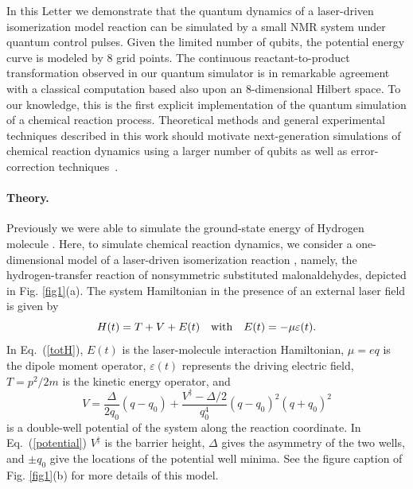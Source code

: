 \documentclass[prl,twocolumn,showpacs]{revtex4}
\newcommand{\be}{\begin{equation}}
\newcommand{\ee}{\end{equation}}
\begin{document}
In this Letter we demonstrate that the quantum dynamics
of a laser-driven isomerization model reaction can be simulated by
a small NMR system under quantum control pulses.
Given the limited number of qubits, the potential energy curve is modeled by 8 grid points.
The continuous reactant-to-product transformation observed in our quantum simulator is in remarkable agreement
with a classical computation based also upon an 8-dimensional Hilbert space.
To our knowledge, this is the first explicit implementation
of the quantum simulation of a chemical reaction process.  Theoretical methods and general experimental techniques described in this work should motivate
next-generation simulations of chemical reaction dynamics using a larger number of qubits as well as error-correction techniques~\cite{Brown}.


\paragraph*{Theory.}

Previously we were able to simulate the ground-state energy of Hydrogen molecule \cite{static_exp2}.
Here, to simulate chemical reaction dynamics, we consider a one-dimensional model of a laser-driven isomerization reaction \cite{hsubway}, namely,
the hydrogen-transfer reaction of nonsymmetric substituted malonaldehydes, depicted in Fig. \ref{fig1}(a).
The system Hamiltonian in the presence of
an external laser field is given by
\be\label{totH}
  H(t)=  T+  V+  E(t) { \quad   \rm  with   \quad    }
                            E(t)=- \mu\varepsilon(t).
\ee
In Eq.~(\ref{totH}),  $E(t)$ is the laser-molecule interaction Hamiltonian,
$ \mu=e  q$ is the dipole moment operator,
$\varepsilon(t)$ represents the driving electric field,
$ {T}={  p}^2/2m$ is the kinetic energy operator, and
\be\label{potential}
 {V}=\frac{\Delta}{2q_0}(  q-q_0)+\frac{V^\ddag-\Delta/2}{q_0^4}(  q-q_0)^2(  q+q_0)^2
\ee
is a double-well potential of the system along the reaction coordinate. In Eq.~(\ref{potential})
$V^\ddag$ is the barrier height, $\Delta$ gives the asymmetry of the two wells, and $\pm q_0$ give the locations of the potential well minima.
See the figure caption of Fig. \ref{fig1}(b) for more details of this model.
\end{document}
